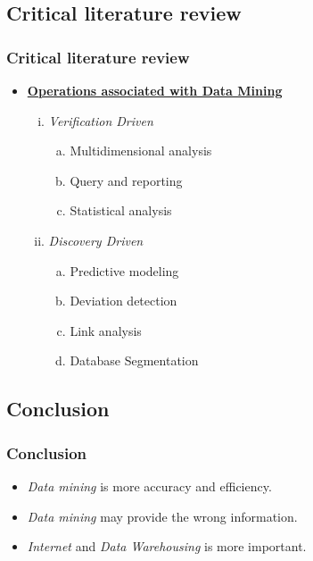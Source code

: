 \documentclass{beamer}
\begin{document}
\begin{frame}
\section{Critical literature review}
\frametitle{Critical literature review}
\begin{itemize}
\item[] \textbf{\underline{Operations associated with Data Mining}} \\
\begin{enumerate}[i.]
\item \textit{Verification Driven}
\begin{enumerate}[a)]
\item Multidimensional analysis
\item Query and reporting
\item Statistical analysis
\end{enumerate}
\item \textit{Discovery Driven}
\begin{enumerate}[a)]
\item Predictive modeling
\item Deviation detection
\item Link analysis
\item Database Segmentation
\end{enumerate}
\end{enumerate}
\end{itemize}
\end{frame}

\begin{frame}
\section{Conclusion}
\frametitle{Conclusion}
\begin{itemize}
\item \textit{Data mining} is more accuracy and efficiency.
\item \textit{Data mining} may provide the wrong information.
\item \textit{Internet} and \textit{Data Warehousing} is more important. 
\end{itemize}
\end{frame}
\end{document}
